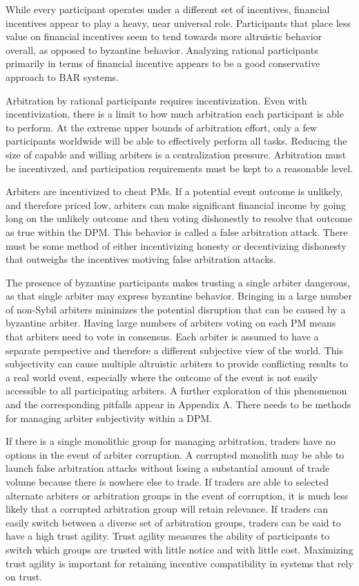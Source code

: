 \documentclass[onecolumn]{article}
\begin{document}
While every participant operates under a different set of incentives, financial incentives appear to play a heavy, near universal role.
Participants that place less value on financial incentives seem to tend towards more altruistic behavior overall, as opposed to byzantine behavior.
Analyzing rational participants primarily in terms of financial incentive appears to be a good conservative approach to BAR systems.

Arbitration by rational participants requires incentivization.
Even with incentivization, there is a limit to how much arbitration each participant is able to perform.
At the extreme upper bounds of arbitration effort, only a few participants worldwide will be able to effectively perform all tasks.
Reducing the size of capable and willing arbiters is a centralization pressure.
Arbitration must be incentivzed, and participation requirements must be kept to a reasonable level.

Arbiters are incentivized to cheat PMs.
If a potential event outcome is unlikely, and therefore priced low, arbiters can make significant financial income by going long on the unlikely outcome and then voting dishonestly to resolve that outcome as true within the DPM.
This behavior is called a false arbitration attack.
There must be some method of either incentivizing honesty or decentivizing dishonesty that outweighs the incentives motiving false arbitration attacks.

The presence of byzantine participants makes trusting a single arbiter dangerous, as that single arbiter may express byzantine behavior.
Bringing in a large number of non-Sybil \cite{sybil} \cite{sybil-wiki} arbiters minimizes the potential disruption that can be caused by a byzantine arbiter.
Having large numbers of arbiters voting on each PM means that arbiters need to vote in consensus.
Each arbiter is assumed to have a separate perspective and therefore a different subjective view of the world.
This subjectivity can cause multiple altruistic arbiters to provide conflicting results to a real world event, especially where the outcome of the event is not easily accessible to all participating arbiters.
A further exploration of this phenomenon and the corresponding pitfalls appear in Appendix A.
There needs to be methods for managing arbiter subjectivity within a DPM.

If there is a single monolithic group for managing arbitration, traders have no options in the event of arbiter corruption.
A corrupted monolith may be able to launch false arbitration attacks without losing a substantial amount of trade volume because there is nowhere else to trade.
If traders are able to selected alternate arbiters or arbitration groups in the event of corruption, it is much less likely that a corrupted arbitration group will retain relevance.
If traders can easily switch between a diverse set of arbitration groups, traders can be said to have a high trust agility.
Trust agility measures the ability of participants to switch which groups are trusted with little notice and with little cost.
Maximizing trust agility is important for retaining incentive compatibility in systems that rely on trust.
\end{document}
